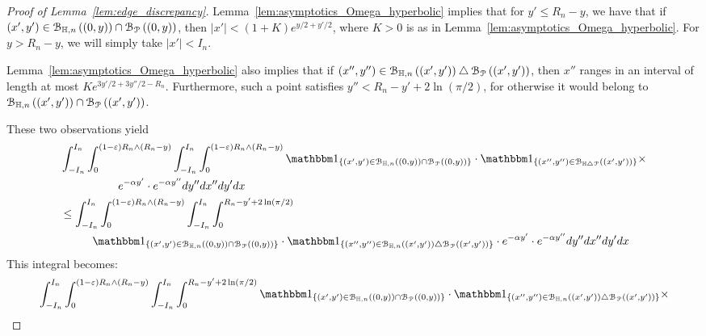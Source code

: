 \begin{proof}[Proof of Lemma~\ref{lem:edge_discrepancy}]
Lemma~\ref{lem:asymptotics_Omega_hyperbolic} implies that for 
$y'\leq R_n -y$, we have that if 
$(x',y') \in {\mathcal B}_{\mathbb{H},n}\left((0,y)\right) \cap {\mathcal B}_{{\mathcal P}}\left((0,y)\right)$, then 
$|x'| < (1+ K) e^{y/2 + y'/2}$, where $K >0$ is as in Lemma~\ref{lem:asymptotics_Omega_hyperbolic}. 
For $y> R_n - y$, we will simply take $|x'| < I_n$. 
 
Lemma~\ref{lem:asymptotics_Omega_hyperbolic} also implies 
that if $(x'',y'') \in  {\mathcal B}_{\mathbb{H},n}\left((x',y')\right) \bigtriangleup {\mathcal B}_{{\mathcal P}}\left((x',y')\right)$, then $x''$ ranges 
in an interval of length at most $K e^{3y'/2 + 3y''/2 - R_n}$. 
Furthermore, such a point satisfies $y'' < R_n - y' + 2\ln (\pi/2)$, for otherwise 
it would belong to ${\mathcal B}_{\mathbb{H},n}\left((x',y')\right) \cap {\mathcal B}_{{\mathcal P}}\left((x',y')\right)$. 

These two observations yield
\begin{equation*}
\begin{split}
&\int_{-I_n}^{I_n} \int_0^{(1-\eps) R_n\wedge (R_n-y)}\int_{-I_n}^{I_n} \int_0^{(1-\eps) R_n \wedge (R_n-y)}
 \ind{(x',y') \in \BallHyp{(0,y)}\cap \BallPo{(0,y)}} \cdot 
 \ind{(x'',y'') \in \BallSym{(x',y')}}\times \\
& \hspace{1.8cm} e^{-\alpha y'} \cdot e^{-\alpha y''} dy'' dx''dy' dx \\
&\leq \int_{-I_n}^{I_n} \int_0^{(1-\eps) R_n \wedge (R_n - y)}\int_{-I_n}^{I_n} \int_0^{ R_n-y'+2\ln (\pi/2)} \\
&\hspace{1cm} \ind{(x',y') \in \BallHyp{(0,y)}\cap \BallPo{(0,y)}} \cdot 
 \ind{(x'',y'') \in \BallHyp{(x',y')}\bigtriangleup \BallPo{(x',y')}}\cdot
  e^{-\alpha y'} \cdot e^{-\alpha y''} dy'' dx''dy' dx
\end{split}
\end{equation*}
This integral becomes: 
\begin{equation*}
\begin{split}
&\int_{-I_n}^{I_n} \int_0^{(1-\eps) R_n \wedge (R_n - y)}\int_{-I_n}^{I_n} \int_0^{ R_n-y'+2\ln (\pi/2)}
 \ind{(x',y') \in \BallHyp{(0,y)}\cap \BallPo{(0,y)}} \cdot 
 \ind{(x'',y'') \in \BallHyp{(x',y')}\bigtriangleup \BallPo{(x',y')}}\times \\

\end{split}
\end{equation*}
\end{proof}
